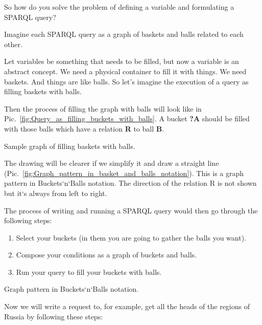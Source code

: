 So how do you solve the problem of defining a variable and formulating a SPARQL query?

Imagine each SPARQL query as a graph of baskets and balls related to each other. 

Let variables be something that needs to be filled, but now a variable is an abstract concept. We need a physical container to fill it with things. We need baskets. And things are like balls. So let's imagine the execution of a query as filling baskets with balls.

Then the process of filling the graph with balls will look like in Pic.~\ref{fig:Query_as_filling_buckets_with_balls}. A bucket \textbf{?A} should be filled with those balls which have a relation \textbf{R} to ball \textbf{B}.

\begin{marginfigure}
	{
		\setlength{\fboxsep}{0pt}%
		\setlength{\fboxrule}{1pt}%
	}
    \caption{Sample graph of filling baskets with balls.}
	\label{fig:Query_as_filling_buckets_with_balls}
\end{marginfigure}

The drawing will be clearer if we simplify it and draw a straight line (Pic.~\ref{fig:Graph_pattern_in_basket_and_balls_notation}). This is a graph pattern in Buckets`n`Balls notation. The direction of the relation R is not shown but it`s always from left to right.

\newpage
The process of writing and running a SPARQL query would then go through the following steps:
\begin{enumerate}
    \item Select your buckets (in them you are going to gather the balls you want).
    \item Compose your conditions as a graph of buckets and balls.
    \item Run your query to fill your buckets with balls.
\end{enumerate}

\begin{marginfigure}[-3cm]
	{
		\setlength{\fboxsep}{0pt}%
		\setlength{\fboxrule}{1pt}%
	}
    \caption{Graph pattern in Buckets`n`Balls notation.}
	\label{fig:Graph_pattern_in_basket_and_balls_notation}
\end{marginfigure}

Now we will write a request to, for example, get all the heads of the regions of Russia by following these steps:

